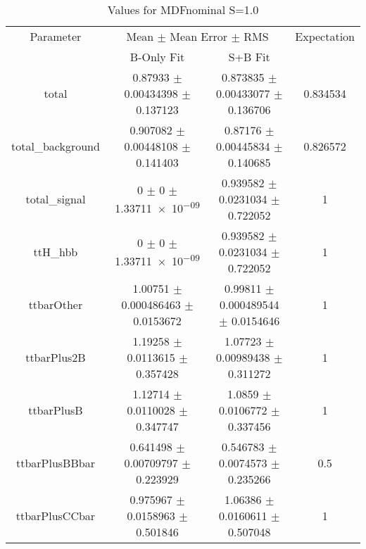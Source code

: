 \begin{table}
\centering
\caption{Values for MDFnominal S=1.0}
\begin{tabular}{cccc}
\toprule
Parameter & \multicolumn{2}{c}{Mean $\pm$ Mean Error $\pm$ RMS} & Expectation\\
 & B-Only Fit & S+B Fit & \\
\midrule
total & \num{0.87933} $\pm$ \num{0.00434398} $\pm$ \num{0.137123} & \num{0.873835} $\pm$ \num{0.00433077} $\pm$ \num{0.136706} & \num{0.834534}\\
total\_background & \num{0.907082} $\pm$ \num{0.00448108} $\pm$ \num{0.141403} & \num{0.87176} $\pm$ \num{0.00445834} $\pm$ \num{0.140685} & \num{0.826572}\\
total\_signal & \num{0} $\pm$ \num{0} $\pm$ \num{1.33711e-09} & \num{0.939582} $\pm$ \num{0.0231034} $\pm$ \num{0.722052} & \num{1}\\
ttH\_hbb & \num{0} $\pm$ \num{0} $\pm$ \num{1.33711e-09} & \num{0.939582} $\pm$ \num{0.0231034} $\pm$ \num{0.722052} & \num{1}\\
ttbarOther & \num{1.00751} $\pm$ \num{0.000486463} $\pm$ \num{0.0153672} & \num{0.99811} $\pm$ \num{0.000489544} $\pm$ \num{0.0154646} & \num{1}\\
ttbarPlus2B & \num{1.19258} $\pm$ \num{0.0113615} $\pm$ \num{0.357428} & \num{1.07723} $\pm$ \num{0.00989438} $\pm$ \num{0.311272} & \num{1}\\
ttbarPlusB & \num{1.12714} $\pm$ \num{0.0110028} $\pm$ \num{0.347747} & \num{1.0859} $\pm$ \num{0.0106772} $\pm$ \num{0.337456} & \num{1}\\
ttbarPlusBBbar & \num{0.641498} $\pm$ \num{0.00709797} $\pm$ \num{0.223929} & \num{0.546783} $\pm$ \num{0.0074573} $\pm$ \num{0.235266} & \num{0.5}\\
ttbarPlusCCbar & \num{0.975967} $\pm$ \num{0.0158963} $\pm$ \num{0.501846} & \num{1.06386} $\pm$ \num{0.0160611} $\pm$ \num{0.507048} & \num{1}\\
\bottomrule
\end{tabular}
\end{table}